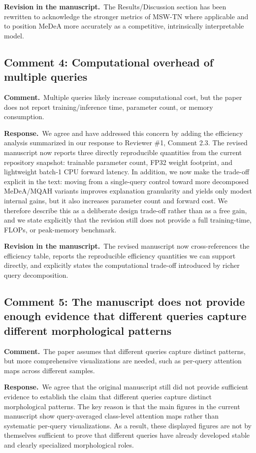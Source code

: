 \documentclass[11pt]{article}
\newcommand{\commentheader}{\textbf{Comment.}}
\newcommand{\responseheader}{\textbf{Response.}}
\newcommand{\revisionheader}{\textbf{Revision in the manuscript.}}
\begin{document}
\revisionheader\ The Results/Discussion section has been rewritten to acknowledge the stronger metrics of MSW-TN where applicable and to position MeDeA more accurately as a competitive, intrinsically interpretable model.

\subsection*{Comment 4: Computational overhead of multiple queries}

\commentheader\ Multiple queries likely increase computational cost, but the paper does not report training/inference time, parameter count, or memory consumption.

\responseheader\ We agree and have addressed this concern by adding the efficiency analysis summarized in our response to Reviewer \#1, Comment 2.3. The revised manuscript now reports three directly reproducible quantities from the current repository snapshot: trainable parameter count, FP32 weight footprint, and lightweight batch-1 CPU forward latency. In addition, we now make the trade-off explicit in the text: moving from a single-query control toward more decomposed MeDeA/MQAH variants improves explanation granularity and yields only modest internal gains, but it also increases parameter count and forward cost. We therefore describe this as a deliberate design trade-off rather than as a free gain, and we state explicitly that the revision still does not provide a full training-time, FLOPs, or peak-memory benchmark.

\revisionheader\ The revised manuscript now cross-references the efficiency table, reports the reproducible efficiency quantities we can support directly, and explicitly states the computational trade-off introduced by richer query decomposition.

\subsection*{Comment 5: The manuscript does not provide enough evidence that different queries capture different morphological patterns}

\commentheader\ The paper assumes that different queries capture distinct patterns, but more comprehensive visualizations are needed, such as per-query attention maps across different samples.

\responseheader\ We agree that the original manuscript still did not provide sufficient evidence to establish the claim that different queries capture distinct morphological patterns. The key reason is that the main figures in the current manuscript show query-averaged class-level attention maps rather than systematic per-query visualizations. As a result, these displayed figures are not by themselves sufficient to prove that different queries have already developed stable and clearly specialized morphological roles.
\end{document}
